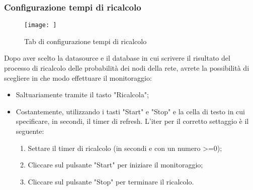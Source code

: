 \subsubsection{Configurazione tempi di ricalcolo}
\begin{figure} [H]
	\centering
	\texttt{[image: ]} 
	\caption{Tab di configurazione tempi di ricalcolo} \label{} 
\end{figure} 
Dopo aver scelto la datasource e il database in cui scrivere il risultato del processo di ricalcolo delle probabilità dei nodi della rete, avrete la possibilità di scegliere in che modo effettuare il monitoraggio:
\begin{itemize}
	\item Saltuariamente tramite il tasto "Ricalcola";
	\item Costantemente, utilizzando i tasti "Start" e "Stop" e la cella di testo in cui specificare, in secondi, il timer di refresh. L'iter per il corretto settaggio è il seguente:
		\begin{enumerate}
				\item Settare il timer di ricalcolo (in secondi e con un numero >=0);
				\item Cliccare sul pulsante "Start" per iniziare il monitoraggio;
				\item Cliccare sul pulsante "Stop" per terminare il ricalcolo.
		\end{enumerate}
\end{itemize}